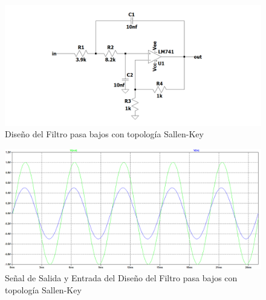 \begin{enumerate}
\begin{itemize}
                \begin{figure}[H]
                      \centering
                      \setcounter{figure}{30}
                      \includegraphics[width=15cm]{Imagenes/sim_sallen_key_circuito.png}
                      \caption{Diseño del Filtro pasa bajos con topología Sallen-Key}
                      \label{fig:sim_sallen_key_circuito}
                \end{figure}

                \begin{figure}[H]
                      \centering
                      \renewcommand{\figurename}{Gráfica}
                      \setcounter{figure}{10}
                      \includegraphics[width=15cm]{Imagenes/sim_sallen_key_vo.png}
                      \caption{Señal de Salida y Entrada del Diseño del Filtro pasa bajos con topología Sallen-Key}
                      \label{fig:sim_sallen_key_vo}
                \end{figure}


\end{itemize}
\end{enumerate}
